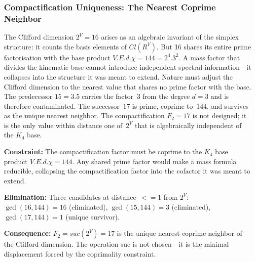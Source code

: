 \documentclass[11pt,a4paper]{book}
\def\cdot{.}%
\def\leq{<=}%
\def\mathrm#1{#1}%
\def\mathbb#1{#1}%
\def\texttt#1{#1}%
\begin{document}
\subsubsection*{Compactification Uniqueness: The Nearest Coprime Neighbor}

The Clifford dimension $2^V = 16$ arises as an algebraic invariant of the simplex
structure: it counts the basis elements of $\mathrm{Cl}(\mathbb{R}^V)$.  But 16
shares its entire prime factorisation with the base product
$V \cdot E \cdot d \cdot \chi = 144 = 2^4 \cdot 3^2$.
A mass factor that divides the kinematic base cannot introduce independent spectral
information---it collapses into the structure it was meant to extend.
Nature must adjust the Clifford dimension to the nearest value that shares no prime
factor with the base.  The predecessor $15 = 3 \cdot 5$ carries the factor~$3$ from
the degree $d = 3$ and is therefore contaminated.  The successor~$17$ is prime,
coprime to~$144$, and survives as the unique nearest neighbor.
The compactification $F_2 = 17$ is not designed; it is the only value within distance
one of~$2^V$ that is algebraically independent of the $K_4$ base.

\medskip
\noindent
\textbf{Constraint:}
The compactification factor must be coprime to the $K_4$ base product
$V \cdot E \cdot d \cdot \chi = 144$.
Any shared prime factor would make a mass formula reducible, collapsing the
compactification factor into the cofactor it was meant to extend.

\noindent
\textbf{Elimination:}
Three candidates at distance~$\leq 1$ from $2^V$:
$\gcd(16, 144) = 16$ (eliminated),
$\gcd(15, 144) = 3$ (eliminated),
$\gcd(17, 144) = 1$ (unique survivor).

\noindent
\textbf{Consequence:}
$F_2 = \mathrm{suc}(2^V) = 17$ is the unique nearest coprime neighbor
of the Clifford dimension.
The operation \texttt{suc} is not chosen---it is the minimal displacement
forced by the coprimality constraint.
\end{document}
